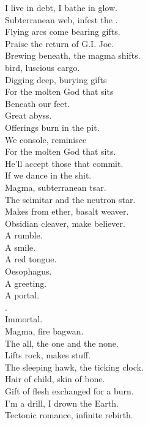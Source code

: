 I live in debt, I bathe in glow. \\
Subterranean web, infest the . \\
Flying arcs come bearing gifts. \\
Praise the return of G.I. Joe. \\

Brewing beneath, the magma shifts. \\
 bird, luscious cargo. \\
Digging deep, burying gifts \\
For the molten God that sits \\
Beneath our feet. \\

Great abyss. \\
Offerings burn in the pit. \\
We console, reminisce \\
For the molten God that sits. \\
He'll accept those that commit. \\
If we dance in the shit. \\

Magma, subterranean tsar. \\
The scimitar and the neutron star. \\
Makes from ether, basalt weaver. \\
Obsidian cleaver, make believer. \\

A rumble. \\
A smile. \\
A red tongue. \\
Oesophagus. \\
A greeting. \\
A portal. \\
. \\
Immortal. \\

Magma, fire bagwan. \\
The all, the one and the none. \\
Lifts rock, makes stuff. \\
The sleeping hawk, the ticking clock. \\

Hair of child, skin of bone. \\
Gift of flesh exchanged for a burn. \\
I'm a drill, I drown the Earth. \\
Tectonic romance, infinite rebirth. \\

